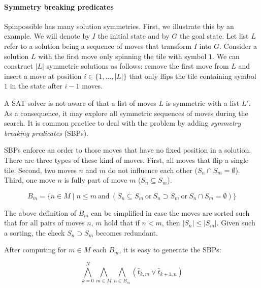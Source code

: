 \documentclass[]{llncs}
\begin{document}
\paragraph{Symmetry breaking predicates}

Spinpossible has many solution symmetries. First, we illustrate this by an example. We will denote by $I$ the initial state and by $G$ the goal state. Let list $L$ refer to a solution being a sequence of moves that transform $I$ into $G$.
Consider a solution $L$ with the first move only spinning the tile with symbol $1$. We can construct $|L|$ symmetric solutions as follows: remove the first move from $L$ and insert a move at position $i \in \{1,\ldots, |L|\}$ that only flips 
the tile containing symbol $1$ in the state after $i-1$ moves.

A SAT solver is not aware of that a list of moves $L$ is symmetric with a list $L'$. As a consequence, it may explore all symmetric sequences of moves during the search. It is common practice to deal with the problem by 
adding {\em symmetry breaking predicates} (SBPs).

SBPs enforce an order to those moves that have no fixed position in a solution. There are three types of these kind of moves. First, all moves that flip a single tile. Second, two moves $n$ and $m$ do not influence each other ($S_n \cap S_m = \emptyset$).
Third,  one move $n$  is fully part of move $m$ ($S_n \subseteq S_m$).


\begin{equation}
B_m = \{ n \in M \mid n \leq m \mathrm{~and~} ( S_n \subseteq S_m \mathrm{~or~} S_n \supset S_m \mathrm{~or~} S_n \cap S_m = \emptyset) \}
\end{equation}

The above definition of $B_m$ can be simplified in case the moves are sorted such that for all pairs of moves $n$, $m$ hold that if $n < m$, then $|S_n| \leq |S_m|$.
Given such a sorting, the check $S_n \supset S_m$ becomes redundant.

After computing for $m \in M$ each $B_m$, it is easy to generate the SBPs:

\begin{equation}
\bigwedge_{k=0}^{N} \bigwedge_{m \in M} \bigwedge_{n \in B_m} (\bar t_{k,m} \lor \bar t_{k+1,n}) 
\end{equation}
\end{document}

